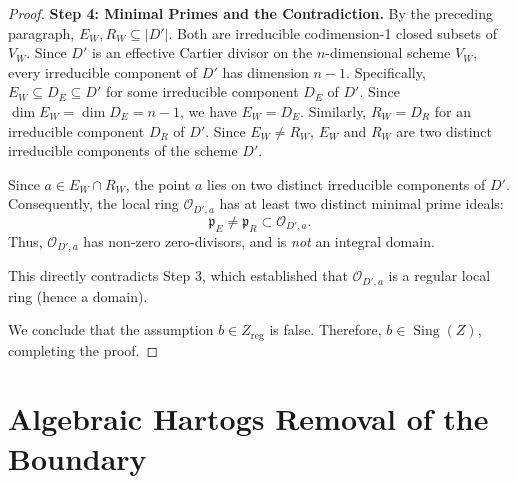 \documentclass[11pt,reqno]{amsart}
\theoremstyle{plain}
\theoremstyle{definition}
\numberwithin{equation}{section}
\DeclareMathOperator{\Sing}{Sing}
\newcommand{\cO}{\mathcal{O}}
\newcommand{\fp}{\mathfrak{p}}
\begin{document}
\begin{proof}
\medskip
\noindent\textbf{Step 4: Minimal Primes and the Contradiction.}
By the preceding paragraph, $E_W, R_W \subseteq |D'|$. Both are irreducible codimension-1 closed subsets of $V_W$.
Since $D'$ is an effective Cartier divisor on the $n$-dimensional scheme $V_W$, every irreducible component of $D'$ has dimension $n-1$.
Specifically, $E_W \subseteq D_E \subseteq D'$ for some irreducible component $D_E$ of $D'$. Since $\dim E_W = \dim D_E = n-1$, we have $E_W = D_E$.
Similarly, $R_W = D_R$ for an irreducible component $D_R$ of $D'$.
Since $E_W \neq R_W$, $E_W$ and $R_W$ are two distinct irreducible components of the scheme $D'$.

Since $a \in E_W \cap R_W$, the point $a$ lies on two distinct irreducible components of $D'$. Consequently, the local ring $\cO_{D', a}$ has at least two distinct minimal prime ideals:
\[
\fp_E \neq \fp_R \subset \cO_{D', a}.
\]
Thus, $\cO_{D', a}$ has non-zero zero-divisors, and is \emph{not} an integral domain.

This directly contradicts Step 3, which established that $\cO_{D', a}$ is a regular local ring (hence a domain).

\medskip
We conclude that the assumption $b \in Z_{\mathrm{reg}}$ is false. Therefore, $b \in \Sing(Z)$, completing the proof.
\end{proof}

\section{Algebraic Hartogs Removal of the Boundary}
\end{document}
